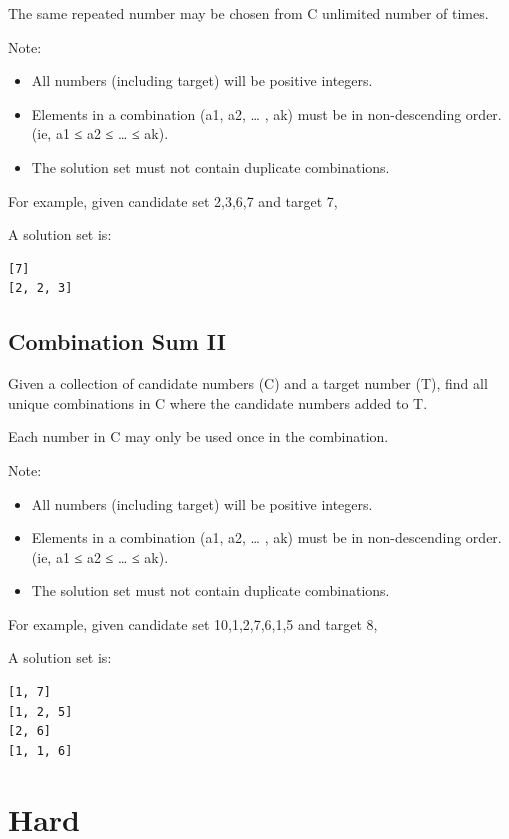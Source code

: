 \documentclass[12pt]{book}
\begin{document}
The same repeated number may be chosen from C unlimited number of times.

Note:
\begin{itemize}
\item All numbers (including target) will be positive integers.
\item Elements in a combination (a1, a2, … , ak) must be in non-descending order. (ie, a1 ≤ a2 ≤ … ≤ ak).
\item The solution set must not contain duplicate combinations.
\end{itemize}

For example, given candidate set 2,3,6,7 and target 7, 

A solution set is: 
\lstset{language=java,label= ,caption= ,numbers=none}
\begin{lstlisting}
[7] 
[2, 2, 3]
\end{lstlisting}
\subsection{Combination Sum II}
\label{sec-11-1-5}
Given a collection of candidate numbers (C) and a target number (T), find all unique combinations in C where the candidate numbers added to T.

Each number in C may only be used once in the combination.

Note:
\begin{itemize}
\item All numbers (including target) will be positive integers.
\item Elements in a combination (a1, a2, … , ak) must be in non-descending order. (ie, a1 ≤ a2 ≤ … ≤ ak).
\item The solution set must not contain duplicate combinations.
\end{itemize}
For example, given candidate set 10,1,2,7,6,1,5 and target 8, 

A solution set is: 
\lstset{language=java,label= ,caption= ,numbers=none}
\begin{lstlisting}
[1, 7] 
[1, 2, 5] 
[2, 6] 
[1, 1, 6]
\end{lstlisting}
\section{Hard}
\label{sec-11-2}
\end{document}
